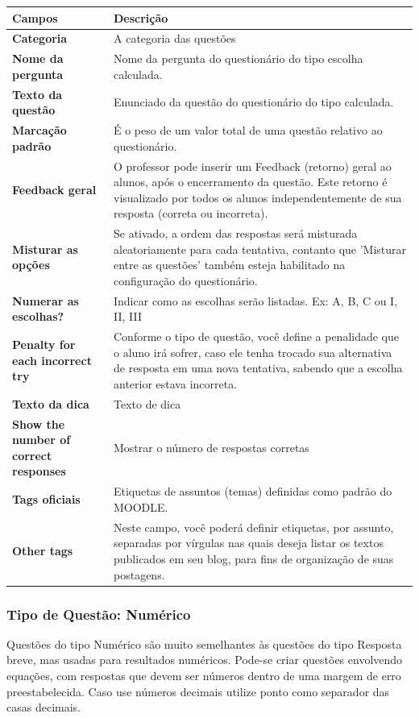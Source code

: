 \begin{longtable}{p{6cm}|p{9cm}}
     \hline
     \rowcolor[rgb]{0.8,0.8,0.8} \textbf{Campos} &  \textbf{Descrição}\\\hline
    \textbf{Categoria} & A categoria das questões \\\hline
    \textbf{Nome da pergunta} & Nome da pergunta do questionário do tipo escolha calculada.\\\hline
    \textbf{Texto da questão} & Enunciado da questão do questionário do tipo calculada. \\\hline
    \textbf{Marcação padrão} & É o peso de um valor total de uma questão relativo ao questionário. \\\hline
    \textbf{Feedback geral} & O professor  pode inserir um  Feedback (retorno)  geral  ao alunos,  após o encerramento da questão. Este retorno é visualizado por todos os alunos independentemente de sua resposta (correta ou incorreta). \\\hline
    \textbf{Misturar as opções} & Se ativado, a ordem das respostas será misturada aleatoriamente para cada tentativa, contanto que 'Misturar entre as questões' também esteja habilitado na configuração do questionário. \\\hline
    \textbf{Numerar as escolhas?} & Indicar como as escolhas serão listadas. Ex: A, B, C ou I, II, III  \\\hline
    \textbf{Penalty for each incorrect try} & Conforme o tipo de questão, você define a  penalidade que o aluno irá sofrer, caso ele tenha trocado sua  alternativa de resposta em uma nova tentativa, sabendo que a escolha anterior estava incorreta.  \\\hline
    \textbf{Texto da dica} & Texto de dica  \\\hline
    \textbf{Show the number of correct responses} & Mostrar o número de respostas corretas  \\\hline
    \textbf{Tags oficiais} & Etiquetas de assuntos (temas) definidas como padrão do MOODLE.  \\\hline
    \textbf{Other tags} & Neste campo, você poderá definir  etiquetas,  por assunto, separadas por vírgulas nas quais deseja listar os textos publicados em seu blog, para fins de organização de suas postagens. \\\hline
\end{longtable}%

\subsubsection{Tipo de Questão: Numérico}
Questões do tipo Numérico são muito semelhantes às questões do tipo Resposta breve, mas usadas para resultados numéricos. Pode-se criar questões envolvendo equações, com respostas que devem ser números dentro de uma margem de erro preestabelecida. Caso use números decimais utilize ponto como separador das casas decimais.

